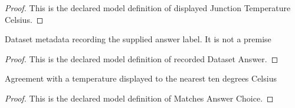 \begin{proof}
  This is the declared model definition of displayed Junction Temperature Celsius.
\end{proof}
\begin{definition}
  \label{def:physics:phyx-mini-0488:phyxminiproblems-problemphyxmini0488-recordeddatasetanswer}
  Dataset metadata recording the supplied answer label. It is not a premise
\end{definition}
\begin{proof}
  This is the declared model definition of recorded Dataset Answer.
\end{proof}
\begin{definition}
  \label{def:physics:phyx-mini-0488:phyxminiproblems-problemphyxmini0488-matchesanswerchoice}
  Agreement with a temperature displayed to the nearest ten degrees Celsius
\end{definition}
\begin{proof}
  This is the declared model definition of Matches Answer Choice.
\end{proof}
